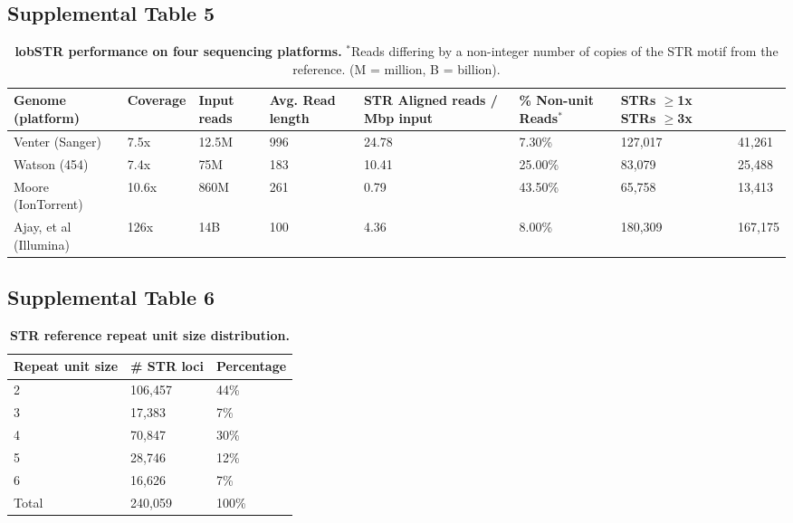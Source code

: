 \subsection{Supplemental Table 5}
\begin{table}[h!]
\centering
\label{tab:lobsuptab5}
\begin{adjustbox}{width=1\textwidth}
\begin{tabular}{l l l l l l l l  }
\hline
Genome (platform) & Coverage& Input reads & Avg. Read length & STR Aligned reads / Mbp input& \% Non-unit Reads$^*$ &	STRs $\geq$1x	STRs $\geq$3x \\
\hline
Venter (Sanger)        & 7.5x  & 12.5M & 996 & 24.78 & 7.30\%  & 127,017 & 41,261  \\
Watson (454)           & 7.4x  & 75M   & 183 & 10.41 & 25.00\% & 83,079  & 25,488  \\
Moore (IonTorrent)     & 10.6x & 860M  & 261 & 0.79  & 43.50\% & 65,758  & 13,413  \\
Ajay, et al (Illumina) & 126x  & 14B   & 100 & 4.36  & 8.00\%  & 180,309 & 167,175 \\
\hline
\end{tabular}
\end{adjustbox}
\caption{\textbf{lobSTR performance on four sequencing platforms.}  $^*$Reads differing by a non-integer number of copies of the STR motif from the reference. (M = million, B = billion). }
\end{table}

\pagebreak

\subsection{Supplemental Table 6}
\begin{table}[h!]
\centering
\label{tab:lobsuptab6}
\begin{tabular}{l l l}
\hline
Repeat unit size & \# STR loci & Percentage \\
\hline
2 &	106,457 &	44\% \\
3&	17,383	&7\% \\
4	&70,847&	30\% \\
5	&28,746	&12\% \\
6	& 16,626	& 7\% \\
Total &	240,059	& 100\% \\
\hline
\end{tabular}
\caption{\textbf{STR reference repeat unit size distribution.}}
\end{table}

